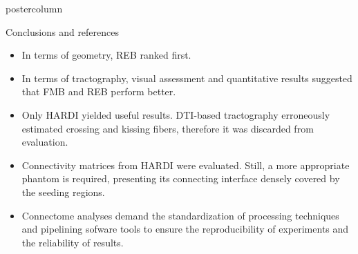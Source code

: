 \documentclass[final,hyperref={pdfpagelabels=false}]{beamer}
\newlength{\columnheight}
\begin{document}
\begin{frame}[t]
{\begin{minipage}[t][\columnheight][c]{0.95\textwidth}
{\begin{columns}[T,totalwidth=\textwidth]
    \begin{column}{.64\textwidth}
      \begin{beamercolorbox}[center,wd=\textwidth]{postercolumn}
        \begin{minipage}[T]{.95\textwidth} %
          \parbox[t]{\textwidth}{ %
          \begin{block}{Conclusions and references}
            \begin{itemize}
              \item In terms of geometry, REB ranked first.
              \item In terms of tractography, visual assessment and
                    quantitative results suggested that FMB and REB perform better.
              \item Only HARDI yielded useful results. DTI-based tractography erroneously
                    estimated crossing and kissing fibers, therefore it was discarded
                    from evaluation.
              \item Connectivity matrices from HARDI were evaluated. Still, a more appropriate
                    phantom is required, presenting its connecting interface
                    densely covered by the seeding regions.
              \item Connectome analyses demand the standardization of
                    processing techniques and pipelining sofware tools to
                    ensure the reproducibility of experiments and the 
                    reliability of results.
            \end{itemize}


\end{block}}
\end{minipage}
\end{beamercolorbox}
\end{column}
\end{columns}}
\end{minipage}}
\end{frame}
\end{document}
